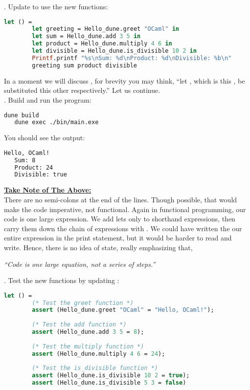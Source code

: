 . Update  to use the new functions:
   \begin{lstlisting}[language=OCaml, caption={Using the Library in Main}]
    let () =
        let greeting = Hello_dune.greet "OCaml" in
        let sum = Hello_dune.add 3 5 in
        let product = Hello_dune.multiply 4 6 in
        let divisible = Hello_dune.is_divisible 10 2 in
        Printf.printf "%s\nSum: %d\nProduct: %d\nDivisible: %b\n"
        greeting sum product divisible
   \end{lstlisting}
\noindent
In a moment we will discuss , for brevity you may think, ``let , which is this , be substituted  this other  respectively.'' Let us continue. \\

. Build and run the program:
   \begin{lstlisting}[language=Bash]
   dune build
   dune exec ./bin/main.exe
   \end{lstlisting}

   \noindent You should see the output:
   \begin{lstlisting}[language=Bash]
   Hello, OCaml!
   Sum: 8
   Product: 24
   Divisible: true
   \end{lstlisting}

   \vspace{1em}
\noindent
\underline{\textbf{Take Note of The Above:}}\\
\indent
There are no semi-colons at the end of the lines. Though possible, that would make the code imperative, not functional.
Again in functional programming, our code is one large expression. We add lets only to shorthand expressions, then carry
them down the chain of expressions with . We could have written the our entire expression in the print statement,
but it would be harder to read and write. Hence, there is no idea of state, really emphasizing that, 

\vspace{1em}
\begin{center}
    \LARGE
\textit{``Code is one large equation, not a series of steps.''}
\end{center}

\newpage 
\noindent
{}. Test the new functions by updating :
   \begin{lstlisting}[language=OCaml, caption={Adding Tests for Multiple Functions}]
    let () =
        (* Test the greet function *)
        assert (Hello_dune.greet "OCaml" = "Hello, OCaml!");
    
        (* Test the add function *)
        assert (Hello_dune.add 3 5 = 8);
    
        (* Test the multiply function *)
        assert (Hello_dune.multiply 4 6 = 24);
    
        (* Test the is_divisible function *)
        assert (Hello_dune.is_divisible 10 2 = true);
        assert (Hello_dune.is_divisible 5 3 = false)
   \end{lstlisting}


